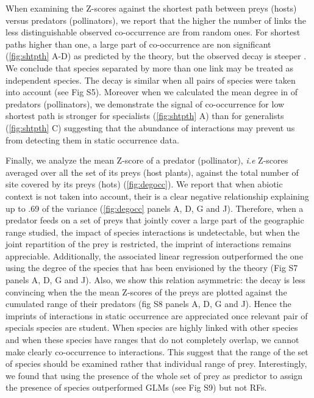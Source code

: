 When examining the Z-scores against the shortest path between preys
(hosts) versus predators (pollinators), we report that the higher the
number of links the less distinguishable observed co-occurrence are from
random ones. For shortest paths higher than one, a large part of
co-occurrence are non significant (\ref{fig:shtpth} A-D) as predicted by
the theory, but the observed decay is steeper \citep{Cazelles2016}. We
conclude that species separated by more than one link may be treated as
independent species. The decay is similar when all pairs of species were
taken into account (see Fig S5). Moreover when we calculated the mean
degree in of predators (pollinators), we demonstrate the signal of
co-occurrence for low shortest path is stronger for specialists
(\ref{fig:shtpth} A) than for generalists (\ref{fig:shtpth} C)
suggesting that the abundance of interactions may prevent us from
detecting them in static occurrence data.

Finally, we analyze the mean Z-score of a predator (pollinator),
\emph{i.e} Z-scores averaged over all the set of its preys (host
plants), against the total number of site covered by its preys (hots)
(\ref{fig:degocc}). We report that when abiotic context is not taken
into account, their is a clear negative relationship explaining up to
.69 of the variance (\ref{fig:degocc} panels A, D, G and J). Therefore,
when a predator feeds on a set of preys that jointly cover a large part
of the geographic range studied, the impact of species interactions is
undetectable, but when the joint repartition of the prey is restricted,
the imprint of interactions remains appreciable. Additionally, the
associated linear regression outperformed the one using the degree of
the species that has been envisioned by the theory (Fig S7 panels A, D,
G and J). Also, we show this relation asymmetric: the decay is less
convincing when the the mean Z-scores of the preys are plotted against
the cumulated range of their predators (fig S8 panels A, D, G and J).
Hence the imprints of interactions in static occurrence are appreciated
once relevant pair of specials species are student. When species are
highly linked with other species and when these species have ranges that
do not completely overlap, we cannot make clearly co-occurrence to
interactions. This suggest that the range of the set of species should
be examined rather that individual range of prey. Interestingly, we
found that using the presence of the whole set of prey as predictor to
assign the presence of species outperformed GLMs (see Fig S9) but not
RFs.

